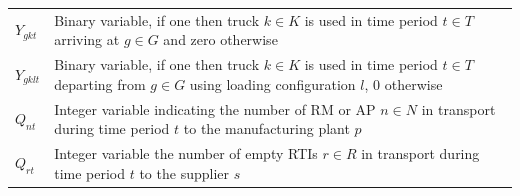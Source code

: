 \begin{longtable}[hbt!]{  |p{}|p{}  |}
  $Y_{gkt}$                                                                                      & Binary variable, if one then  truck $k \in K$ is used in time period $t\in T$ arriving at $g\in G$ and zero otherwise                                                                                                                                                                                                                                                                                                                                                                                                                                                          \\
  $Y_{gklt}$                                                                                     & Binary variable, if one then truck $k \in K$ is used in time period $t\in T$ departing from $g\in G$ using loading configuration $l$, 0 otherwise                                                                                                                                                                                                                                                                                                                                                                                                                              \\
  $Q_{nt}$                                                                                       & Integer variable indicating the number of RM or AP $n\in N$ in transport during time period $t$ to the manufacturing plant $p$                                                                                                                                                                                                                                                                                                                                                                                                                                                 \\
  $Q_{rt}$                                                                                       & Integer variable the number of empty RTIs $r\in R$ in transport during time period $t$ to the supplier $s$                                                                                                                                                                                                                                                                                                                                                                                                                                                                     \\

\end{longtable}
